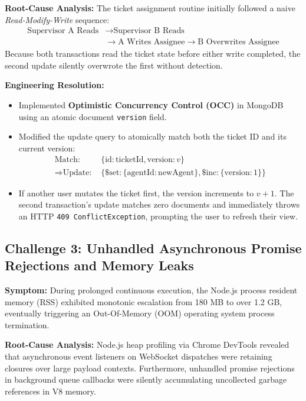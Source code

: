 \textbf{Root-Cause Analysis:} The ticket assignment routine initially followed a naive \textit{Read-Modify-Write} sequence:
\begin{align}
    \text{Supervisor A Reads} &\longrightarrow \text{Supervisor B Reads} \nonumber \\
    &\longrightarrow \text{A Writes Assignee} \longrightarrow \text{B Overwrites Assignee}
\end{align}
Because both transactions read the ticket state before either write completed, the second update silently overwrote the first without detection.

\textbf{Engineering Resolution:}
\begin{itemize}
    \item Implemented \textbf{Optimistic Concurrency Control (OCC)} in MongoDB using an atomic document \texttt{version} field.
    \item Modified the update query to atomically match both the ticket ID and its current version:
    \begin{align}
        \text{Match: } &\{\text{id}: \text{ticketId}, \text{version}: v\} \nonumber \\
        \Longrightarrow \text{Update: } &\{\text{\$set}: \{\text{agentId}: \text{newAgent}\}, \text{\$inc}: \{\text{version}: 1\}\}
    \end{align}
    \item If another user mutates the ticket first, the version increments to $v+1$. The second transaction's update matches zero documents and immediately throws an HTTP \texttt{409 ConflictException}, prompting the user to refresh their view.
\end{itemize}

\subsection{Challenge 3: Unhandled Asynchronous Promise Rejections and Memory Leaks}
\textbf{Symptom:} During prolonged continuous execution, the Node.js process resident memory (RSS) exhibited monotonic escalation from 180 MB to over 1.2 GB, eventually triggering an Out-Of-Memory (OOM) operating system process termination.

\textbf{Root-Cause Analysis:} Node.js heap profiling via Chrome DevTools revealed that asynchronous event listeners on WebSocket dispatches were retaining closures over large payload contexts. Furthermore, unhandled promise rejections in background queue callbacks were silently accumulating uncollected garbage references in V8 memory.

